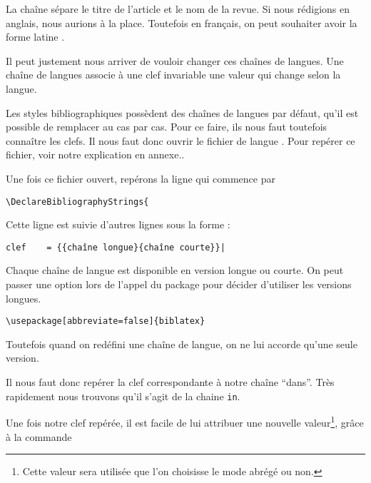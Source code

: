 	 
	 
	\begin{quotation}
		\cite{Junod1992}
	\end{quotation}
	
	La chaîne  sépare le titre de l'article et le nom de la revue. Si nous rédigions en anglais, nous aurions  à la place. Toutefois en français, on peut souhaiter avoir la forme latine . 
	
	Il peut justement nous arriver de vouloir changer ces chaînes de langues. Une chaîne de langues associe à une clef invariable une valeur qui change selon la langue.
	
	Les styles bibliographiques possèdent des chaînes de langues par défaut, qu'il est possible de remplacer au cas par cas. Pour ce faire, ils nous faut toutefois connaître les clefs. Il nous faut donc ouvrir le fichier de langue . Pour repérer ce fichier, voir notre explication en annexe..
	
	Une fois ce fichier ouvert, repérons la ligne qui commence par
	
	\begin{verbatim}
\DeclareBibliographyStrings{
	\end{verbatim}
	
	Cette ligne est suivie d'autres lignes sous la forme :
	
	\begin{verbatim}
clef	= {{chaîne longue}{chaîne courte}}|
	\end{verbatim}
	
	\begin{anedocte}
	Chaque chaîne de langue est disponible en version longue ou courte. On peut passer une option lors de l'appel du package  pour décider d'utiliser les versions longues.
	
	\begin{verbatim}
\usepackage[abbreviate=false]{biblatex}
	\end{verbatim}
	
	 Toutefois quand on redéfini une chaîne de langue, on ne lui accorde qu'une seule version.
	
		

	\end{anedocte}
	Il nous faut donc repérer la clef correspondante à notre chaîne \enquote{dans}. Très rapidement nous trouvons qu'il s'agit de la chaine \verb|in|.
	
	Une fois  notre clef repérée, il est facile de lui attribuer une nouvelle valeur\footnote{Cette valeur sera utilisée que l'on choisisse le mode abrégé ou non.}, grâce à la commande 
	
